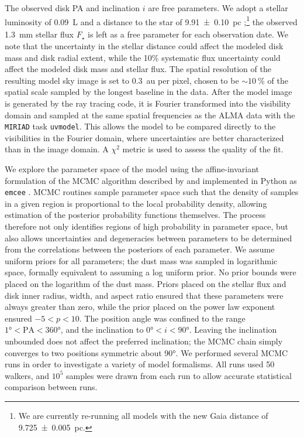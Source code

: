 \documentclass[modern]{aastex62}
\begin{document}
The observed disk PA and inclination $i$ are free parameters.
We adopt a stellar luminosity of \SI{0.09}{L_\sun} \citep{plavchan09} and a distance to the star of \SI{9.91 \pm 0.10}{pc}
\citep{vanleeuwen07};\footnote{We are currently re-running all models with the new Gaia distance of \SI{9.725 \pm 0.005}{pc}.} the observed \SI{1.3}{mm} stellar flux $F_\star$ is left as a free parameter for each observation date.
We note that the uncertainty in the stellar distance could affect the modeled disk mass and disk radial extent, while the 10\% systematic flux uncertainty could affect the modeled disk mass and stellar flux.
The spatial resolution of the resulting model sky image is set to \SI{0.3}{au} per pixel, chosen to be $\sim \SI{10}{\percent}$ of the spatial scale sampled by the longest baseline in the data. 
After the model image is generated by the ray tracing code, it is Fourier transformed into the visibility domain and sampled at the same spatial frequencies as the ALMA data with the \texttt{MIRIAD} task \texttt{uvmodel}.
This allows the model to be compared directly to the visibilities in the Fourier domain, where uncertainties are better characterized than in the image domain.
A $\chi^2$ metric is used to assess the quality of the fit.

We explore the parameter space of the model using the affine-invariant formulation of the MCMC algorithm described by \cite{goodmanweare10} and implemented in Python as \texttt{emcee} \citep{foreman-mackey13}.  
MCMC routines sample parameter space such that the density of samples in a given region is proportional to the local probability density, allowing estimation of the posterior probability functions themselves.
The process therefore not only identifies regions of high probability in parameter space, but also allows uncertainties and degeneracies between parameters to be determined from the correlations between the posteriors of each parameter. 
We assume uniform priors for all parameters; the dust mass was sampled in logarithmic space, formally equivalent to assuming a log uniform prior.
No prior bounds were placed on the logarithm of the dust mass.
Priors placed on the stellar flux and disk inner radius, width, and aspect ratio ensured that these parameters were always greater than zero, while the prior placed on the power law exponent ensured $-5 < p < 10$.
The position angle was confined to the range $\ang{1} < \text{PA} < \ang{360}$, and the inclination to $\ang{0} < i < \ang{90}$.
Leaving the inclination unbounded does not affect the preferred inclination; the MCMC chain simply converges to two positions symmetric about \ang{90}.
We performed several MCMC runs in order to investigate a variety of model formalisms. 
All runs used 50 walkers, and $10^5$ samples were drawn from each run to allow accurate statistical comparison between runs.
\end{document}
